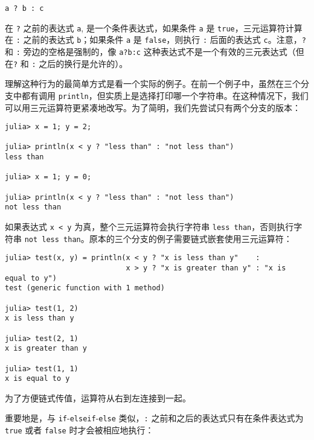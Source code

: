 \begin{verbatim}
a ? b : c
\end{verbatim}



在 \texttt{?} 之前的表达式 \texttt{a}, 是一个条件表达式，如果条件 \texttt{a} 是 \texttt{true}，三元运算符计算在 \texttt{:} 之前的表达式 \texttt{b}；如果条件 \texttt{a} 是 \texttt{false}，则执行 \texttt{:} 后面的表达式 \texttt{c}。注意，\texttt{?} 和 \texttt{:} 旁边的空格是强制的，像 \texttt{a?b:c} 这种表达式不是一个有效的三元表达式（但在\texttt{?} 和 \texttt{:} 之后的换行是允许的）。



理解这种行为的最简单方式是看一个实际的例子。在前一个例子中，虽然在三个分支中都有调用 \texttt{println}，但实质上是选择打印哪一个字符串。在这种情况下，我们可以用三元运算符更紧凑地改写。为了简明，我们先尝试只有两个分支的版本：




\begin{verbatim}
julia> x = 1; y = 2;

julia> println(x < y ? "less than" : "not less than")
less than

julia> x = 1; y = 0;

julia> println(x < y ? "less than" : "not less than")
not less than
\end{verbatim}



如果表达式 \texttt{x < y} 为真，整个三元运算符会执行字符串 \texttt{{\textquotedbl}less than{\textquotedbl}}，否则执行字符串 \texttt{{\textquotedbl}not less than{\textquotedbl}}。原本的三个分支的例子需要链式嵌套使用三元运算符：




\begin{verbatim}
julia> test(x, y) = println(x < y ? "x is less than y"    :
                            x > y ? "x is greater than y" : "x is equal to y")
test (generic function with 1 method)

julia> test(1, 2)
x is less than y

julia> test(2, 1)
x is greater than y

julia> test(1, 1)
x is equal to y
\end{verbatim}



为了方便链式传值，运算符从右到左连接到一起。



重要地是，与 \texttt{if}-\texttt{elseif}-\texttt{else} 类似，\texttt{:} 之前和之后的表达式只有在条件表达式为 \texttt{true} 或者 \texttt{false} 时才会被相应地执行：




